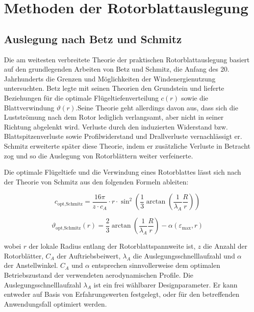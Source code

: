 \newpage %

\section{Methoden der Rotorblattauslegung}
\subsection{Auslegung nach Betz und Schmitz}
\label{subsec:betz-schmitz-auslegung}
Die am weitesten verbreitete Theorie der praktischen Rotorblattauslegung basiert auf den grundlegenden Arbeiten von Betz und Schmitz, die Anfang des 20. Jahrhunderts die Grenzen und Möglichkeiten der Windenergienutzung untersuchten. Betz legte mit seinen Theorien den Grundstein und lieferte Beziehungen für die optimale Flügeltiefenverteilung \( c(r) \) sowie die Blattverwindung \( \vartheta(r) \).Seine Theorie geht allerdings davon aus, dass sich die Lustströmung nach dem Rotor lediglich verlangsamt, aber nicht in seiner Richtung abgelenkt wird. Verluste durch den induzierten Widerstand bzw. Blattspitzenverluste sowie Profilwiderstand und Drallverluste vernachlässigt er. Schmitz erweiterte später diese Theorie, indem er zusätzliche Verluste in Betracht zog und so die Auslegung von Rotorblättern weiter verfeinerte.

Die optimale Flügeltiefe  und die Verwindung  eines Rotorblattes lässt sich nach der Theorie von Schmitz aus den folgenden Formeln ableiten: 
\newline

\begin{equation}
c_{\text{opt,Schmitz}} = \frac{16 \pi}{z \cdot c_A} \cdot r \cdot \sin^2 \left( \frac{1}{3} \arctan \left( \frac{1}{\lambda_A }\frac{R}{r} \right) \right)
\end{equation}
\newline

\begin{equation}
\vartheta_{\text{opt,Schmitz}}(r) = \frac{2}{3} \arctan \left( \frac{1}{\lambda_A} \frac{R}{r} \right) - \alpha \left( \varepsilon_{\text{max}}, r \right)
\end{equation}
\newline

wobei \( r \) der lokale Radius entlang der Rotorblattspannweite ist, \( z \) die Anzahl der Rotorblätter, \( C_A \) der Auftriebsbeiwert, \( \lambda_A \) die Auslegungsschnelllaufzahl und \( \alpha \) der Anstellwinkel. \( C_A \) und \( \alpha \) entsprechen sinnvollerweise dem optimalen Betriebszustand der verwendeten aerodynamischen Profile. Die Auslegungsschnelllaufzahl \( \lambda_A \) ist ein frei wählbarer Designparameter. Er kann entweder auf Basis von Erfahrungswerten festgelegt, oder für den betreffenden Anwendungsfall optimiert werden.

